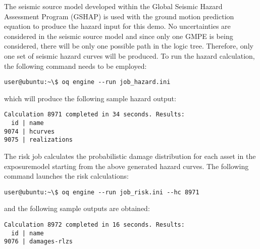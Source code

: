 The seismic source model developed within the Global Seismic Hazard Assessment
Program (GSHAP) is used with the \cite{chiou2008} ground motion prediction
equation to produce the hazard input for this demo. No uncertainties are
considered in the seismic source model and since only one GMPE is being
considered, there will be only one possible path in the logic tree. Therefore,
only one set of seismic hazard curves will be produced. To run the hazard
calculation, the following command needs to be employed:

\begin{verbatim}
user@ubuntu:~\$ oq engine --run job_hazard.ini
\end{verbatim}

which will produce the following sample hazard output:

\begin{verbatim}
Calculation 8971 completed in 34 seconds. Results:
  id | name
9074 | hcurves
9075 | realizations
\end{verbatim}

The risk job calculates the probabilistic damage distribution for each asset
in the \gls{exposuremodel} starting from the above generated hazard curves. The
following command launches the risk calculations:

\begin{verbatim}
user@ubuntu:~\$ oq engine --run job_risk.ini --hc 8971
\end{verbatim}

and the following sample outputs are obtained:

\begin{verbatim}
Calculation 8972 completed in 16 seconds. Results:
  id | name
9076 | damages-rlzs
\end{verbatim}
